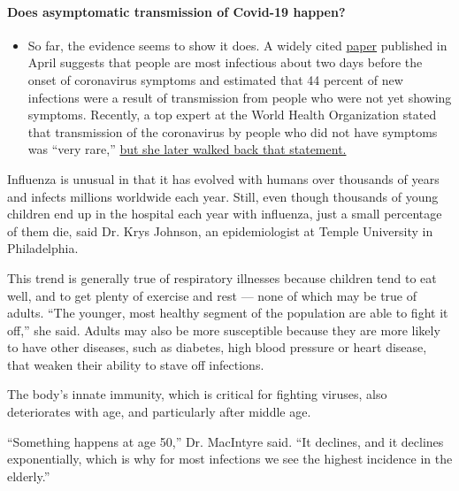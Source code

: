 \begin{itemize}
{  \paragraph{Does asymptomatic transmission of Covid-19
  happen?}\label{does-asymptomatic-transmission-of-covid-19-happen}}

  \begin{itemize}
  \tightlist
  \item
    So far, the evidence seems to show it does. A widely cited
    \href{https://www.nature.com/articles/s41591-020-0869-5}{paper}
    published in April suggests that people are most infectious about
    two days before the onset of coronavirus symptoms and estimated that
    44 percent of new infections were a result of transmission from
    people who were not yet showing symptoms. Recently, a top expert at
    the World Health Organization stated that transmission of the
    coronavirus by people who did not have symptoms was ``very rare,''
    \href{https://www.nytimes.com/2020/06/09/world/coronavirus-updates.html?action=click\&pgtype=Article\&state=default\&region=MAIN_CONTENT_3\&context=storylines_faq\#link-1f302e21}{but
    she later walked back that statement.}
  \end{itemize}
\end{itemize}

Influenza is unusual in that it has evolved with humans over thousands
of years and infects millions worldwide each year. Still, even though
thousands of young children end up in the hospital each year with
influenza, just a small percentage of them die, said Dr. Krys Johnson,
an epidemiologist at Temple University in Philadelphia.

This trend is generally true of respiratory illnesses because children
tend to eat well, and to get plenty of exercise and rest --- none of
which may be true of adults. ``The younger, most healthy segment of the
population are able to fight it off,'' she said. Adults may also be more
susceptible because they are more likely to have other diseases, such as
diabetes, high blood pressure or heart disease, that weaken their
ability to stave off infections.

The body's innate immunity, which is critical for fighting viruses, also
deteriorates with age, and particularly after middle age.

``Something happens at age 50,'' Dr. MacIntyre said. ``It declines, and
it declines exponentially, which is why for most infections we see the
highest incidence in the elderly.''

